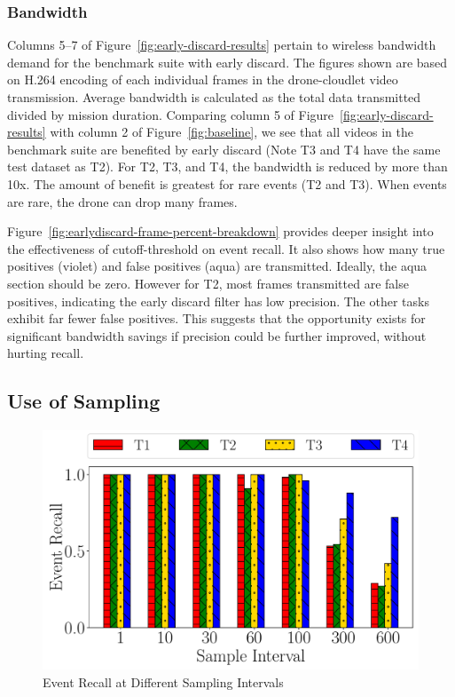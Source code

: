 \subsubsection{Bandwidth}
Columns 5--7 of Figure~\ref{fig:early-discard-results} pertain to wireless
bandwidth demand for the benchmark suite with early discard.  The figures shown
are based on H.264 encoding of each individual frames in the drone-cloudlet
video transmission. Average bandwidth is calculated as the total data
transmitted divided by mission duration.  Comparing column 5 of
Figure~\ref{fig:early-discard-results} with column 2 of
Figure~\ref{fig:baseline}, we see that all videos in the benchmark suite are
benefited by early discard (Note T3 and T4 have the same test dataset as T2).
For T2, T3, and T4, the bandwidth is reduced by more than 10x. The amount of
benefit is greatest for rare events (T2 and T3).  When events are rare, the
drone can drop many frames.

Figure~\ref{fig:earlydiscard-frame-percent-breakdown} provides deeper insight
into the effectiveness of cutoff-threshold on event recall. It also shows how
many true positives (violet) and false positives (aqua) are
transmitted. Ideally, the aqua section should be zero.  However for T2, most
frames transmitted are false positives, indicating the early discard filter has
low precision.  The other tasks exhibit far fewer false positives.  This
suggests that the opportunity exists for significant bandwidth savings if
precision could be further improved, without hurting recall.

\subsection{Use of Sampling}

\begin{figure}[h]
    \centering
    \includegraphics[width=.9\linewidth]{FIGS/fig-random-select-interval-recall-hatch.pdf}
\caption{Event Recall at Different Sampling Intervals}
\label{fig:sampling-only}
\end{figure}



